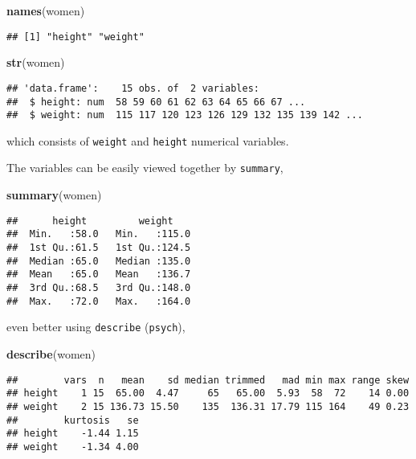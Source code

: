 \documentclass[]{book}
\newenvironment{Shaded}{\begin{snugshade}}{\end{snugshade}}
\newcommand{\KeywordTok}[1]{\textcolor[rgb]{0.13,0.29,0.53}{\textbf{#1}}}
\newcommand{\NormalTok}[1]{#1}
\theoremstyle{definition}
\theoremstyle{definition}
\theoremstyle{remark}
\begin{document}
\begin{Shaded}
\begin{Highlighting}[]
\KeywordTok{names}\NormalTok{(women)}
\end{Highlighting}
\end{Shaded}

\begin{verbatim}
## [1] "height" "weight"
\end{verbatim}

\begin{Shaded}
\begin{Highlighting}[]
\KeywordTok{str}\NormalTok{(women)}
\end{Highlighting}
\end{Shaded}

\begin{verbatim}
## 'data.frame':    15 obs. of  2 variables:
##  $ height: num  58 59 60 61 62 63 64 65 66 67 ...
##  $ weight: num  115 117 120 123 126 129 132 135 139 142 ...
\end{verbatim}

which consists of \texttt{weight} and \texttt{height} numerical
variables.

The variables can be easily viewed together by \texttt{summary},

\begin{Shaded}
\begin{Highlighting}[]
\KeywordTok{summary}\NormalTok{(women)}
\end{Highlighting}
\end{Shaded}

\begin{verbatim}
##      height         weight     
##  Min.   :58.0   Min.   :115.0  
##  1st Qu.:61.5   1st Qu.:124.5  
##  Median :65.0   Median :135.0  
##  Mean   :65.0   Mean   :136.7  
##  3rd Qu.:68.5   3rd Qu.:148.0  
##  Max.   :72.0   Max.   :164.0
\end{verbatim}

even better using \texttt{describe} (\texttt{psych}),

\begin{Shaded}
\begin{Highlighting}[]
\KeywordTok{describe}\NormalTok{(women)}
\end{Highlighting}
\end{Shaded}

\begin{verbatim}
##        vars  n   mean    sd median trimmed   mad min max range skew
## height    1 15  65.00  4.47     65   65.00  5.93  58  72    14 0.00
## weight    2 15 136.73 15.50    135  136.31 17.79 115 164    49 0.23
##        kurtosis   se
## height    -1.44 1.15
## weight    -1.34 4.00
\end{verbatim}
\end{document}
